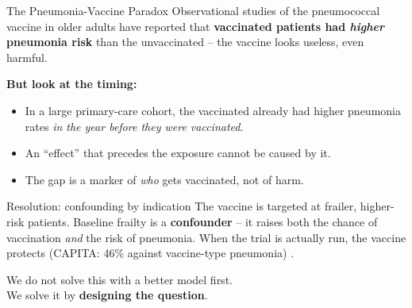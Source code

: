\documentclass[aspectratio=169]{beamer}
\begin{document}
\begin{frame}{The Pneumonia-Vaccine Paradox}
  \small
  Observational studies of the pneumococcal vaccine in older adults have
  reported that \textbf{vaccinated patients had \emph{higher} pneumonia risk}
  than the unvaccinated -- the vaccine looks useless, even harmful.
  \vspace{0.5em}

  \textbf{But look at the timing:}
  \begin{itemize}
    \item In a large primary-care cohort, the vaccinated already had higher
      pneumonia rates \emph{in the year before they were vaccinated}.
    \item An ``effect'' that precedes the exposure cannot be caused by it.
    \item The gap is a marker of \emph{who} gets vaccinated, not of harm.
  \end{itemize}
  \vspace{0.5em}

  \begin{block}{Resolution: confounding by indication}
    The vaccine is targeted at frailer, higher-risk patients. Baseline
    frailty is a \textbf{confounder} -- it raises both the chance of
    vaccination \emph{and} the risk of pneumonia. When the trial is actually
    run, the vaccine protects (CAPITA: 46\% against vaccine-type pneumonia)
    \cite{bonten2015capita}.
  \end{block}
\end{frame}

\begin{frame}[standout]
  We do not solve this with a better model first.\\[0.8em]
  We solve it by \textbf{designing the question}.
\end{frame}
\end{document}
